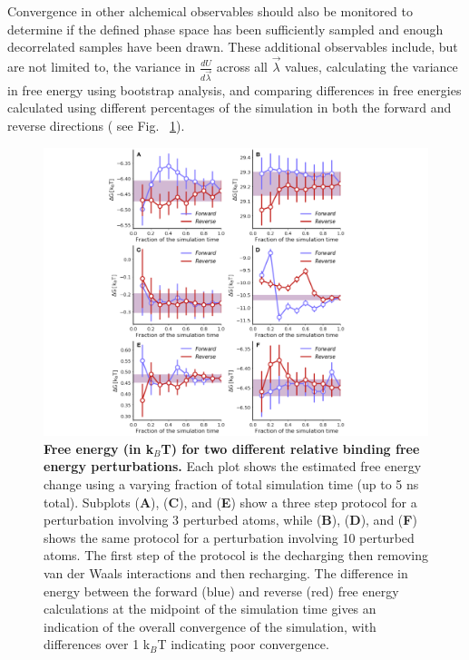 \documentclass[9pt,bestpractices]{livecoms}
\begin{document}
Convergence in other alchemical observables should also be monitored to determine if the defined phase space has been sufficiently sampled and enough decorrelated samples have been drawn. These additional observables include, but are not limited to, the variance in $\frac{dU}{d\vec{\lambda}}$ across all $\vec{\lambda}$ values, calculating the variance in free energy using bootstrap analysis, and comparing differences in free energies calculated using different percentages of the simulation in both the forward and reverse directions ( see Fig. ~\ref{fig:convergence_forward_reverse}).

\begin{figure}
    \centering
    \includegraphics[width=0.95\linewidth]{figures/fig10_forward_reverse/Figure.pdf}
    \caption{\textbf{Free energy (in k$_{B}$T) for two different relative binding free energy perturbations.} 
    Each plot shows the estimated free energy change using a varying fraction of total simulation time (up to 5 ns total). 
    Subplots (\textbf{A}), (\textbf{C}), and (\textbf{E}) show a three step protocol for a perturbation involving 3 perturbed atoms, while (\textbf{B}), (\textbf{D}), and (\textbf{F}) shows the same protocol for a perturbation involving 10 perturbed atoms. The first step of the protocol is the decharging then removing van der Waals interactions and then recharging. The difference in energy between the forward (blue) and reverse (red) free energy calculations at the midpoint of the simulation time gives an indication of the overall convergence of the simulation, with differences over 1 k$_{B}$T indicating poor convergence.}
    \label{fig:convergence_forward_reverse}
\end{figure}
\end{document}
